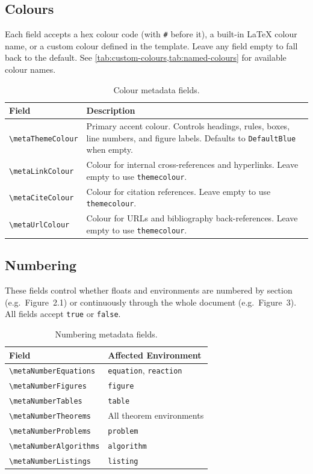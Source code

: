 \subsection{Colours}
Each field accepts a hex colour code (with \texttt{\#} before it), a built-in \LaTeX{} colour name, or a custom colour defined in the template. Leave any field empty to fall back to the default. See \cref{tab:custom-colours,tab:named-colours} for available colour names.

\begin{table}[H]
	\centering
	\caption{Colour metadata fields.}
	\label{tab:meta-colours}
	\begin{tabularx}{\linewidth}{@{}lX@{}}
		\toprule
		Field & Description \\
		\midrule
		\texttt{\textbackslash metaThemeColour} & Primary accent colour. Controls headings, rules, boxes, line numbers, and figure labels. Defaults to \texttt{DefaultBlue} when empty. \\
		\texttt{\textbackslash metaLinkColour}  & Colour for internal cross-references and hyperlinks. Leave empty to use \texttt{themecolour}. \\
		\texttt{\textbackslash metaCiteColour}  & Colour for citation references. Leave empty to use \texttt{themecolour}. \\
		\texttt{\textbackslash metaUrlColour}   & Colour for URLs and bibliography back-references. Leave empty to use \texttt{themecolour}. \\
		\bottomrule
	\end{tabularx}
\end{table}

\subsection{Numbering}
These fields control whether floats and environments are numbered by section (e.g.\ Figure~2.1) or continuously through the whole document (e.g.\ Figure~3). All fields accept \texttt{true} or \texttt{false}.

\begin{table}[H]
	\centering
	\caption{Numbering metadata fields.}
	\label{tab:meta-numbering}
	\begin{tabular}{@{}ll@{}}
		\toprule
		Field & Affected Environment \\
		\midrule
		\texttt{\textbackslash metaNumberEquations}  & \texttt{equation}, \texttt{reaction} \\
		\texttt{\textbackslash metaNumberFigures}    & \texttt{figure} \\
		\texttt{\textbackslash metaNumberTables}     & \texttt{table} \\
		\texttt{\textbackslash metaNumberTheorems}   & All theorem environments \\
		\texttt{\textbackslash metaNumberProblems}   & \texttt{problem} \\
		\texttt{\textbackslash metaNumberAlgorithms} & \texttt{algorithm} \\
		\texttt{\textbackslash metaNumberListings} 	 & \texttt{listing} \\
		\bottomrule
	\end{tabular}
\end{table}

